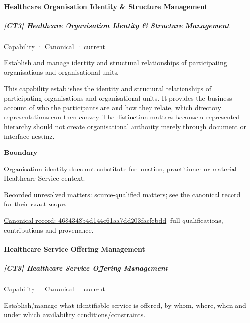\paragraph{Healthcare Organisation Identity \& Structure Management}

\subparagraph{[CT3] Healthcare Organisation Identity \& Structure Management}

\label{element:4684348b4d144e61aa7dd203facfebdd}
{\small Capability · Canonical · current}\par

Establish and manage identity and structural relationships of participating organisations and organisational units.



This capability establishes the identity and structural relationships of participating organisations and organisational units. It provides the business account of who the participants are and how they relate, which directory representations can then convey. The distinction matters because a represented hierarchy should not create organisational authority merely through document or interface nesting.



\textbf{Boundary}



Organisation identity does not substitute for location, practitioner or material Healthcare Service context.


{\small Recorded unresolved matters: source-qualified matters; see the canonical record for their exact scope.}\par
{\footnotesize \href{../../../../continuum/strategy/capability/4684348b4d144e61aa7dd203facfebdd.md}{Canonical record: 4684348b4d144e61aa7dd203facfebdd}; full qualifications, contributions and provenance.}\par
\paragraph{Healthcare Service Offering Management}

\subparagraph{[CT3] Healthcare Service Offering Management}

\label{element:9fe177e4422b4853acb1dd0d0b74c4ba}
{\small Capability · Canonical · current}\par

Establish/manage what identifiable service is offered, by whom, where, when and under which availability conditions/constraints.



